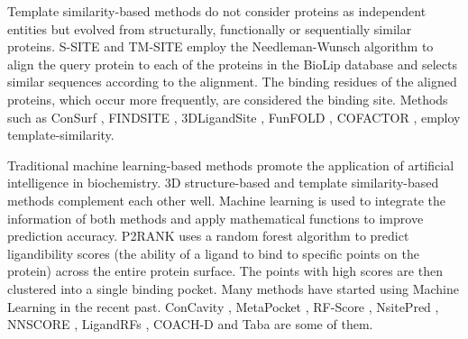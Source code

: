 \documentclass[journal=jacsat,manuscript=article]{achemso}
\begin{document}
Template similarity-based methods do not consider proteins as independent entities but evolved from structurally, functionally or sequentially similar proteins. S-SITE and TM-SITE \cite{yang2013protein} employ the Needleman-Wunsch algorithm to align the query protein to each of the proteins in the BioLip \cite{yang2012biolip} database and selects similar sequences according to the alignment. The binding residues of the aligned proteins, which occur more frequently, are considered the binding site. Methods such as ConSurf \cite{glaser2003consurf}, FINDSITE \cite{brylinski2008threading}, 3DLigandSite \cite{wass20103dligandsite}, FunFOLD \cite{roche2011funfold}, COFACTOR \cite{roy2012recognizing}, employ template-similarity.

Traditional machine learning-based methods promote the application of artificial intelligence in biochemistry. 3D structure-based and template similarity-based methods complement each other well. Machine learning is used to integrate the information of both methods and apply mathematical functions to improve prediction accuracy. P2RANK \cite{krivak2015improving} \cite{krivak2018p2rank} uses a random forest algorithm to predict ligandibility scores (the ability of a ligand to bind to specific points on the protein) across the entire protein surface. The points with high scores are then clustered into a single binding pocket. Many methods have started using Machine Learning in the recent past. ConCavity \cite{capra2009predicting}, MetaPocket \cite{huang2009metapocket}, RF-Score \cite{ballester2010machine}, NsitePred \cite{chen2012prediction}, NNSCORE \cite{durrant2010nnscore} \cite{durrant2011nnscore}, LigandRFs \cite{chen2014ligandrfs}, COACH-D \cite{wu2018coach} and Taba \cite{da2020taba} are some of them.
\end{document}
